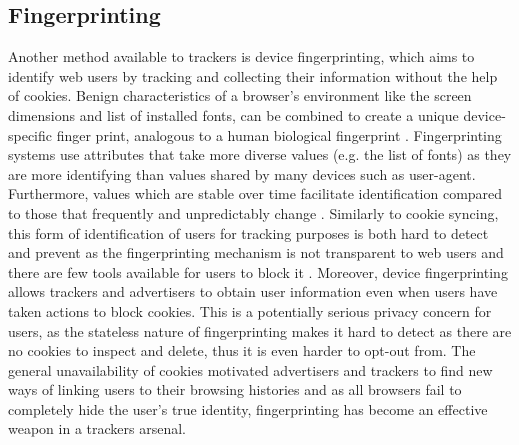 \documentclass[12pt]{article}
\begin{document}
\subsection{Fingerprinting} \label{fingerprinting}
Another method available to trackers is device fingerprinting, which aims to identify web users by tracking and collecting their information without the help of cookies. Benign characteristics of a browser's environment like the screen dimensions and list of installed fonts, can be combined to create a unique device-specific finger print, analogous to a human biological fingerprint \parencite{uniqueBrowser}. Fingerprinting systems use attributes that take more diverse values (e.g. the list of fonts) as they are more identifying than values shared by many devices such as user-agent. Furthermore, values which are stable over time facilitate identification compared to those that frequently and unpredictably change \parencite{dustingFP}. Similarly to cookie syncing, this form of identification of users for tracking purposes is both hard to detect and prevent as the fingerprinting mechanism is not transparent to web users and there are few tools available for users to block it \parencite{uniqueBrowser}. Moreover, device fingerprinting allows trackers and advertisers to obtain user information even when  users have taken actions to block cookies. This is a potentially serious privacy concern for users, as the stateless nature of fingerprinting makes it hard to detect as there are no cookies to inspect and delete, thus it is even harder to opt-out from. The general unavailability of cookies motivated advertisers and trackers to find new ways of linking users to their browsing histories and as all browsers fail to completely hide the user's true identity, fingerprinting has become an effective weapon in a trackers arsenal. \newline 
\end{document}
